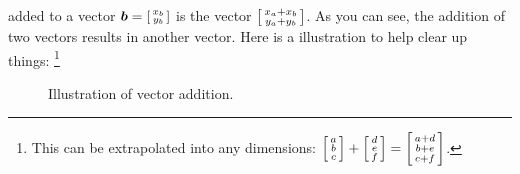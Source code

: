 \) added to a vector \(
\vec{b}=
\begin{bsmallmatrix}
  x_b \\
  y_b
\end{bsmallmatrix}
\) is the vector \(
\begin{bsmallmatrix}
  x_a + x_b \\
  y_a + y_b
\end{bsmallmatrix}
\). As you can see, the addition of two vectors results in another vector. Here is a illustration to help clear up things: \footnote{This can be extrapolated into any dimensions: \(\begin{bsmallmatrix}
  a \\
  b \\
  c
\end{bsmallmatrix}+\begin{bsmallmatrix}
  d \\
  e \\
  f
\end{bsmallmatrix} = \begin{bsmallmatrix}
  a+d \\
  b+e \\
  c+f
\end{bsmallmatrix} \).}
\begin{figure}[h]
  \centering
  \caption{Illustration of vector addition.}
  \label{vecadd}
\end{figure}



